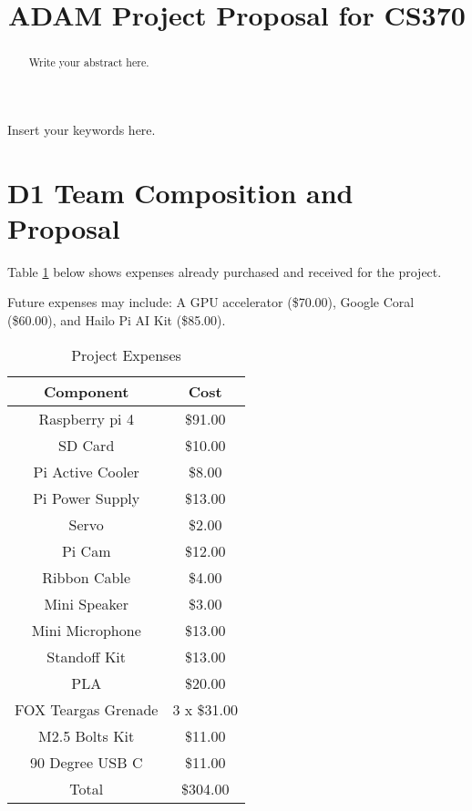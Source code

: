 \documentclass[conference]{IEEEtran}
\begin{document}
\title{ADAM Project Proposal for CS370}

\author{
\and
{}
}


\maketitle

\begin{abstract}
Write your abstract here.
\end{abstract}

\begin{IEEEkeywords}
Insert your keywords here.
\end{IEEEkeywords}

\section{D1 Team Composition and Proposal}

Table \ref{table1} below shows expenses already purchased and received for the project.

Future expenses may include: 
A GPU accelerator (\$70.00), Google Coral (\$60.00), and Hailo Pi AI Kit (\$85.00).

\begin{table}[H]
    \centering
    \renewcommand{\arraystretch}{1.5}
\caption{Project Expenses}
\label{table1}
    \begin{tabular}{||c c||} \hline 
     Component & Cost  \\ [0.5ex] 
     \hline\hline
         Raspberry pi 4& \$91.00 \\ \hline 
         SD Card& \$10.00\\ \hline 
         Pi Active Cooler& \$8.00\\ \hline 
         Pi Power Supply& \$13.00 \\ \hline 
         Servo& \$2.00\\ \hline 
         Pi Cam& \$12.00\\ \hline 
         Ribbon Cable& \$4.00 \\ \hline 
         Mini Speaker& \$3.00\\ \hline 
         Mini Microphone& \$13.00\\ \hline 
         Standoff Kit& \$13.00\\ \hline 
 PLA& \$20.00\\ \hline 
 FOX Teargas Grenade& 3 x \$31.00\\ \hline 
 M2.5 Bolts Kit& \$11.00\\ \hline 
 90 Degree USB C& \$11.00\\ \hline 
 Total& \$304.00\\ [1ex] 
 \hline 
    \end{tabular}
\end{table}
\end{document}
